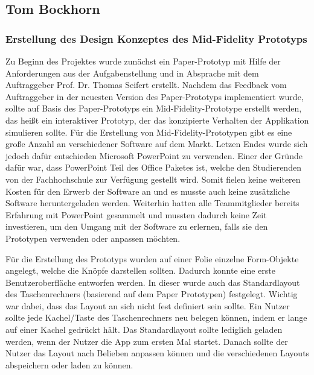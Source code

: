 \FloatBarrier

\clearpage

\subsection{Tom Bockhorn}


\subsubsection{Erstellung des Design Konzeptes des Mid-Fidelity Prototyps }
\label{subsubsection:erstellung-des-design-konzeptes-des-mid-fidelity}

Zu Beginn des Projektes wurde zunächst ein Paper-Prototyp mit Hilfe der Anforderungen aus der Aufgabenstellung und in Absprache mit dem Auftraggeber Prof. Dr. Thomas Seifert erstellt. Nachdem das Feedback vom Auftraggeber in der neuesten Version des Paper-Prototyps implementiert wurde, sollte auf Basis des Paper-Prototyps ein Mid-Fidelity-Prototype erstellt werden, das heißt ein interaktiver Prototyp, der das konzipierte Verhalten der Applikation simulieren sollte. Für die Erstellung von Mid-Fidelity-Prototypen gibt es eine große Anzahl an verschiedener Software auf dem Markt. Letzen Endes wurde sich jedoch dafür entschieden Microsoft PowerPoint zu verwenden. Einer der Gründe dafür war, dass PowerPoint Teil des Office Paketes ist, welche den Studierenden von der Fachhochschule zur Verfügung gestellt wird. Somit fielen keine weiteren Kosten für den Erwerb der Software an und es musste auch keine zusätzliche Software heruntergeladen werden. Weiterhin hatten alle Teammitglieder bereits Erfahrung mit PowerPoint gesammelt und mussten dadurch keine Zeit investieren, um den Umgang mit der Software zu erlernen, falls sie den Prototypen verwenden oder anpassen möchten.  

Für die Erstellung des Prototyps wurden auf einer Folie einzelne Form-Objekte angelegt, welche die Knöpfe darstellen sollten. Dadurch konnte eine erste Benutzeroberfläche entworfen werden. In dieser wurde auch das Standardlayout des Taschenrechners (basierend auf dem Paper Prototypen) festgelegt. Wichtig war dabei, dass das Layout an sich nicht fest definiert sein sollte. Ein Nutzer sollte jede Kachel/Taste des Taschenrechners neu belegen können, indem er lange auf einer Kachel gedrückt hält. Das Standardlayout sollte lediglich geladen werden, wenn der Nutzer die App zum ersten Mal startet. Danach sollte der Nutzer das Layout nach Belieben anpassen können und die verschiedenen Layouts abspeichern oder laden zu können.  

